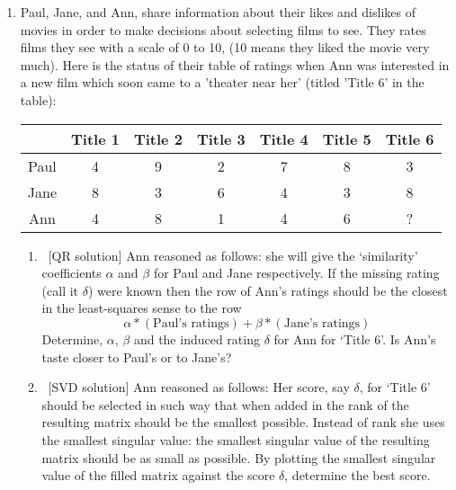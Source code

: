 \documentclass[11pt]{article}
\begin{document}
\begin{enumerate}
	\item Paul, Jane, and Ann, share information about their likes and dislikes of movies in order to make decisions about selecting films to see. They rates films they see with a scale of 0 to 10, (10 means they liked the movie very much). Here is the status of their table of ratings when Ann was interested in a new film which soon came to a ’theater near her’ (titled ’Title 6’ in the table):
	      \begin{center}
		      \begin{tabular}{|c|c|c|c|c|c|c|}
			      \hline
			           & Title 1 & Title 2 & Title 3 & Title 4 & Title 5 & Title 6 \\
			      \hline
			      Paul & 4       & 9       & 2       & 7       & 8       & 3       \\
			      \hline
			      Jane & 8       & 3       & 6       & 4       & 3       & 8       \\
			      \hline
			      Ann  & 4       & 8       & 1       & 4       & 6       & ?       \\
			      \hline
		      \end{tabular}
	      \end{center}
	      \begin{enumerate}
		      \item\ [QR solution] Ann reasoned as follows: she will give the `similarity’ coefficients \(\alpha\) and \(\beta\) for Paul and Jane respectively.  If the missing rating (call it \(\delta\)) were known then the row of Ann’s ratings should be the closest in the least-squares sense to the row
		      \[\alpha * (\text{Paul's ratings}) + \beta * (\text{Jane's ratings})\]
		      Determine, \(\alpha\), \(\beta\) and the induced rating \(\delta\) for Ann for `Title 6'.  Is Ann’s taste closer to Paul’s or to Jane’s?

		      \item\ [SVD solution] Ann reasoned as follows: Her score, say \(\delta\), for `Title 6' should be selected in such way that when added in the rank of the resulting matrix should be the smallest possible.  Instead of rank she uses the smallest singular value: the smallest singular value of the resulting matrix should be as small as possible.  By plotting the \color{red} smallest singular value \color{black} of the filled matrix against the score \(\delta\), determine the best score.
	      \end{enumerate}


\end{enumerate}
\end{document}
